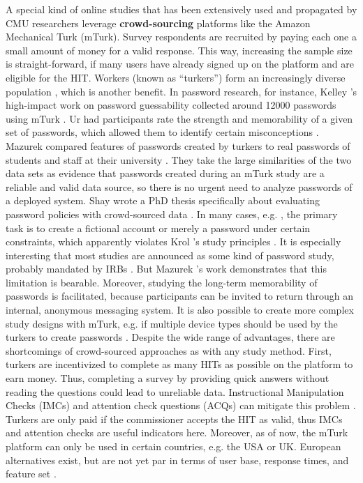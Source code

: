 A special kind of online studies that has been extensively used and propagated by \acrshort{CMU} researchers leverage \textbf{crowd-sourcing} platforms like the Amazon Mechanical Turk (\gls{mTurk}). Survey respondents are recruited by paying each one a small amount of money for a valid response. This way, increasing the sample size is straight-forward, if many users have already signed up on the platform and are eligible for the \acrfull{HIT}. Workers (known as ``turkers'') form an increasingly diverse population \cite{Ross2010WhoAreTurkers}, which is another benefit.
In password research, for instance, Kelley \etal's high-impact work on password guessability collected around 12000 passwords using \gls{mTurk} \cite{Kelley20012GuessAgain}. Ur \etal had participants rate the strength and memorability of a given set of passwords, which allowed them to identify certain misconceptions \cite{Ur2016PerceptionsPassword}. Mazurek \etal compared features of passwords created by turkers to real passwords of students and staff at their university \cite{Mazurek2013Measuring}. They take the large similarities of the two data sets as evidence that passwords created during an mTurk study are a reliable and valid data source, so there is no urgent need to analyze passwords of a deployed system. Shay wrote a PhD thesis specifically about evaluating password policies with crowd-sourced data \cite{Shay2015UsablePoliciesMTurk}. 
In many cases, e.g. \cite{Shay2014CanLongPasswordsBeSecureAndUsable,Shay2016DesigningPasswordPolicies,Ur2017DataDrivenPWMeter}, the primary task is to create a fictional account or merely a password under certain constraints, which apparently violates Krol \etal's study principles \cite{Krol2016ExperimentDesign}. It is especially interesting that most studies are announced as some kind of password study, probably mandated by \glspl{IRB} . But Mazurek \etal's work demonstrates that this limitation is bearable. Moreover, studying the long-term memorability of passwords is facilitated, because participants can be invited to return through an internal, anonymous messaging system. It is also possible to create more complex study designs with mTurk, e.g. if multiple device types should be used by the turkers to create passwords \cite{Melicher2016UsabilityMobileTextPasswords}. 
Despite the wide range of advantages, there are shortcomings of crowd-sourced approaches as with any study method. First, turkers are incentivized to complete as many HITs as possible on the platform to earn money. Thus, completing a survey by providing quick answers without reading the questions could lead to unreliable data. Instructional Manipulation Checks (IMCs) and attention check questions (ACQs) can mitigate this problem \cite{Oppenheimer2009InstructionalManipulationChecks, Peer2017BeyondTheTurk}. Turkers are only paid if the commissioner accepts the HIT as valid, thus IMCs and attention checks are useful indicators here. Moreover, as of now, the mTurk platform can only be used in certain countries, e.g. the USA or UK. European alternatives exist, but are not yet par in terms of user base, response times, and feature set \cite{Peer2017BeyondTheTurk}. 

